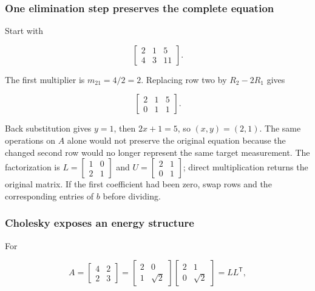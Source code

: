 \subsubsection{One elimination step preserves the complete equation}\label{one-elimination-step-preserves-the-complete-equation}

Start with

\[
\left[\begin{array}{cc|c}2&1&5\\4&3&11\end{array}\right].
\]

The first multiplier is \(m_{21}=4/2=2\). Replacing row two by \(R_2-2R_1\) gives

\[
\left[\begin{array}{cc|c}2&1&5\\0&1&1\end{array}\right].
\]

Back substitution gives \(y=1\), then \(2x+1=5\), so \((x,y)=(2,1)\). The same operations on \(A\) alone would not preserve the original equation because the changed second row would no longer represent the same target measurement. The factorization is \(L=\begin{bmatrix}1&0\\2&1\end{bmatrix}\) and \(U=\begin{bmatrix}2&1\\0&1\end{bmatrix}\); direct multiplication returns the original matrix. If the first coefficient had been zero, swap rows and the corresponding entries of \(b\) before dividing.

\subsubsection{Cholesky exposes an energy structure}\label{cholesky-exposes-an-energy-structure}

For

\[
A=\begin{bmatrix}4&2\\2&3\end{bmatrix}
=\begin{bmatrix}2&0\\1&\sqrt2\end{bmatrix}
\begin{bmatrix}2&1\\0&\sqrt2\end{bmatrix}=LL^\mathsf T,
\]

